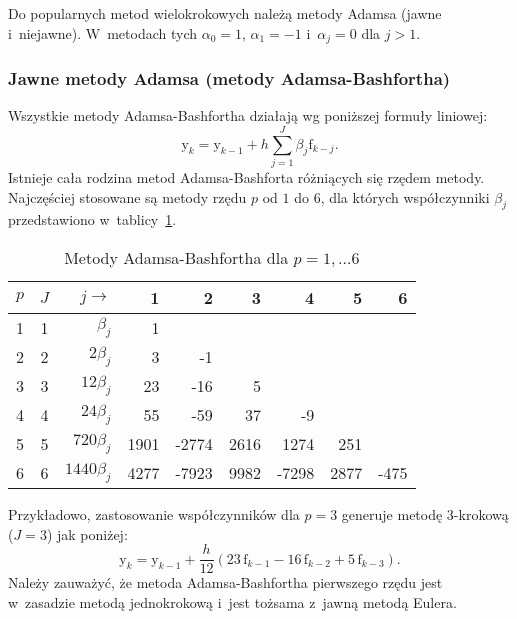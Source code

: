 \documentclass[paper=a4,DIV=12]{lpas}
\newcommand{\brm}[1]{\bm{\mathrm{#1}}}
\begin{document}
\begin{appendices}
Do popularnych metod wielokrokowych należą metody Adamsa (jawne i~niejawne).
W~metodach tych $\alpha_0=1$, $\alpha_1=-1$ i~$\alpha_j = 0$ dla $j > 1$.

\subsubsection{Jawne metody Adamsa (metody Adamsa-Bashfortha)}
\label{sec:JVLO6}

Wszystkie metody Adamsa-Bashfortha działają wg poniższej formuły liniowej:
\begin{equation}
  \brm{y}_k = \brm{y}_{k-1} + h \sum_{j=1}^J \beta_j \brm{f}_{k-j}.
  \label{eq:DUQAC}
\end{equation}
Istnieje cała rodzina metod Adamsa-Bashforta różniących się rzędem metody.
Najczęściej stosowane są metody rzędu $p$ od $1$ do $6$, dla których
współczynniki $\beta_j$ przedstawiono w~tablicy~\ref{tab:OWS53}.
\begin{table}[htbp]
  \caption{Metody Adamsa-Bashfortha dla $p=1,\dots6$}
  \label{tab:OWS53}
  \centering
  \begin{tabular}{|c|c|r|r|r|r|r|r|r|}
    \hline
    $p$ & $J$ & $j \rightarrow$ &    1 &    2 &    3 &    4 & 5    & 6    \\ \hline
     1  &  1  &   $\beta_j$     &    1 &      &      &      &      &      \\
     2  &  2  &   $2\beta_j$    &    3 &   -1 &      &      &      &      \\
     3  &  3  &  $12\beta_j$    &   23 &  -16 &    5 &      &      &      \\
     4  &  4  &  $24\beta_j$    &   55 &  -59 &   37 &   -9 &      &      \\
     5  &  5  & $720\beta_j$    & 1901 &-2774 & 2616 & 1274 &  251 &      \\
     6  &  6  &$1440\beta_j$    & 4277 &-7923 & 9982 &-7298 & 2877 & -475 \\ \hline
  \end{tabular}
\end{table}
Przykładowo, zastosowanie współczynników dla $p=3$ generuje metodę 3-krokową
($J=3$) jak poniżej:
\begin{equation}
  \brm{y}_{k} =  \brm{y}_{k-1} + \frac{h}{12} \left(23\,\brm{f}_{k-1} - 16\,\brm{f}_{k-2} + 5\,\brm{f}_{k-3} \right).
  \label{eq:IYF96}
\end{equation}
Należy zauważyć, że metoda Adamsa-Bashfortha pierwszego rzędu jest w~zasadzie
metodą jednokrokową i~jest tożsama z~jawną metodą Eulera.



\end{appendices}
\end{document}
